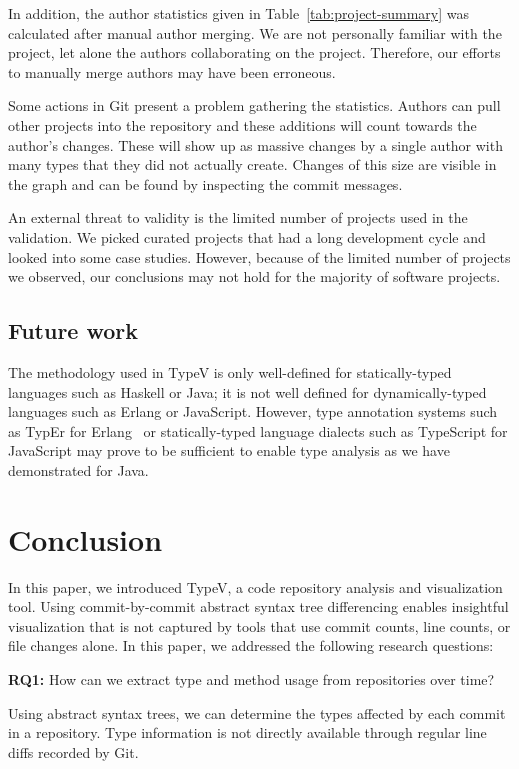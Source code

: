 In addition, the author statistics given in Table~\ref{tab:project-summary} was calculated after manual author merging. We are not personally familiar with the project, let alone the authors collaborating on the project. Therefore, our efforts to manually merge authors may have been erroneous.

Some actions in Git present a problem gathering the statistics. Authors can pull other projects into the repository and these additions will count towards the author's changes. These will show up as massive changes by a single author with many types that they did not actually create. Changes of this size are visible in the graph and can be found by inspecting the commit messages.

An external threat to validity is the limited number of projects used in the validation. We picked curated projects that had a long development cycle and looked into some case studies. However, because of the limited number of projects we observed, our conclusions may not hold for the majority of software projects.

\subsection{Future work}

The methodology used in TypeV is only well-defined for statically-typed languages such as Haskell or Java; it is not well defined for dynamically-typed languages such as Erlang or JavaScript. However, type annotation systems such as TypEr for Erlang~\cite{typer} or statically-typed language dialects such as TypeScript for JavaScript may prove to be sufficient to enable type analysis as we have demonstrated for Java.

\section{Conclusion}

In this paper, we introduced TypeV, a code repository analysis and visualization tool. Using commit-by-commit abstract syntax tree differencing enables insightful visualization that is not captured by tools that use commit counts, line counts, or file changes alone. In this paper, we addressed the following research questions:

\textbf{RQ1:} How can we extract type and method usage from repositories over time?

\begin{framed}
\noindent
Using abstract syntax trees, we can determine the types affected by each commit in a repository. Type information is not directly available through regular line diffs recorded by Git.
\end{framed}

